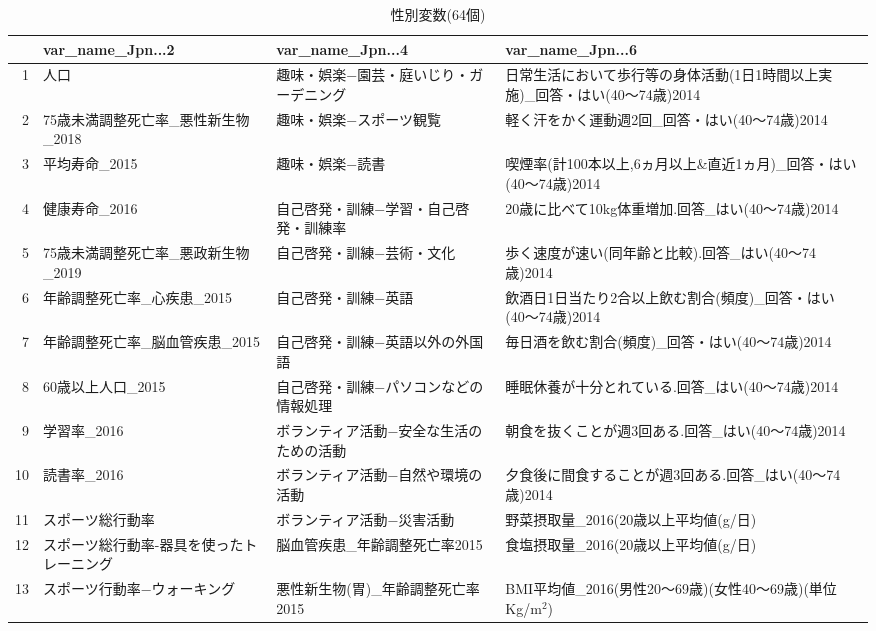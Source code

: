 \begin{table}[ht]
\centering
\caption{性別変数(64個)}
\label{table_mf_d.tex}
\begingroup\tiny

\begin{adjustbox}{width=.5\textwidth}
\begin{tabular}{rlll}
  \hline
 & var\_name\_Jpn...2 & var\_name\_Jpn...4 & var\_name\_Jpn...6 \\
  \hline
1 & 人口 & 趣味・娯楽−園芸・庭いじり・ガーデニング & 日常生活において歩行等の身体活動(1日1時間以上実施)\_回答・はい(40〜74歳)2014 \\
  2 & 75歳未満調整死亡率\_悪性新生物\_2018 & 趣味・娯楽−スポーツ観覧 & 軽く汗をかく運動週2回\_回答・はい(40〜74歳)2014 \\
  3 & 平均寿命\_2015 & 趣味・娯楽−読書 & 喫煙率(計100本以上,6ヵ月以上\&直近1ヵ月)\_回答・はい(40〜74歳)2014 \\
  4 & 健康寿命\_2016 & 自己啓発・訓練−学習・自己啓発・訓練率 & 20歳に比べて10kg体重増加.回答\_はい(40〜74歳)2014 \\
  5 & 75歳未満調整死亡率\_悪政新生物\_2019 & 自己啓発・訓練−芸術・文化 & 歩く速度が速い(同年齢と比較).回答\_はい(40〜74歳)2014 \\
  6 & 年齢調整死亡率\_心疾患\_2015 & 自己啓発・訓練−英語 & 飲酒日1日当たり2合以上飲む割合(頻度)\_回答・はい(40〜74歳)2014 \\
  7 & 年齢調整死亡率\_脳血管疾患\_2015 & 自己啓発・訓練−英語以外の外国語 & 毎日酒を飲む割合(頻度)\_回答・はい(40〜74歳)2014 \\
  8 & 60歳以上人口\_2015 & 自己啓発・訓練−パソコンなどの情報処理 & 睡眠休養が十分とれている.回答\_はい(40〜74歳)2014 \\
  9 & 学習率\_2016 & ボランティア活動−安全な生活のための活動 & 朝食を抜くことが週3回ある.回答\_はい(40〜74歳)2014 \\
  10 & 読書率\_2016 & ボランティア活動−自然や環境の活動 & 夕食後に間食することが週3回ある.回答\_はい(40〜74歳)2014 \\
  11 & スポーツ総行動率 & ボランティア活動−災害活動 & 野菜摂取量\_2016(20歳以上平均値(g/日) \\
  12 & スポーツ総行動率-器具を使ったトレーニング & 脳血管疾患\_年齢調整死亡率2015 & 食塩摂取量\_2016(20歳以上平均値(g/日) \\
  13 & スポーツ行動率−ウォーキング & 悪性新生物(胃)\_年齢調整死亡率2015 & BMI平均値\_2016(男性20〜69歳)(女性40〜69歳)(単位Kg/m$^2$) \\

\end{tabular}
\end{adjustbox}
\end{table}
